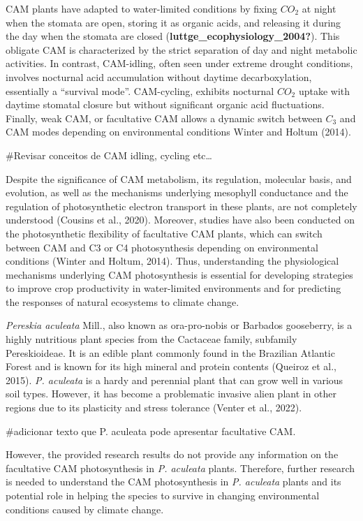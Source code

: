 \documentclass[
  12pt,
  letterpaper,
  DIV=11,
  numbers=noendperiod]{scrartcl}
\begin{document}
CAM plants have adapted to water-limited conditions by fixing \(CO_2\)
at night when the stomata are open, storing it as organic acids, and
releasing it during the day when the stomata are closed
(\textbf{luttge\_ecophysiology\_2004?}). This obligate CAM is
characterized by the strict separation of day and night metabolic
activities. In contrast, CAM-idling, often seen under extreme drought
conditions, involves nocturnal acid accumulation without daytime
decarboxylation, essentially a ``survival mode''. CAM-cycling, exhibits
nocturnal \(CO_2\) uptake with daytime stomatal closure but without
significant organic acid fluctuations. Finally, weak CAM, or facultative
CAM allows a dynamic switch between \(C_3\) and CAM modes depending on
environmental conditions Winter and Holtum (2014).

\#Revisar conceitos de CAM idling, cycling etc\ldots{}

Despite the significance of CAM metabolism, its regulation, molecular
basis, and evolution, as well as the mechanisms underlying mesophyll
conductance and the regulation of photosynthetic electron transport in
these plants, are not completely understood (Cousins et al., 2020).
Moreover, studies have also been conducted on the photosynthetic
flexibility of facultative CAM plants, which can switch between CAM and
C3 or C4 photosynthesis depending on environmental conditions (Winter
and Holtum, 2014). Thus, understanding the physiological mechanisms
underlying CAM photosynthesis is essential for developing strategies to
improve crop productivity in water-limited environments and for
predicting the responses of natural ecosystems to climate change.

\emph{Pereskia aculeata} Mill., also known as ora-pro-nobis or Barbados
gooseberry, is a highly nutritious plant species from the Cactaceae
family, subfamily Pereskioideae. It is an edible plant commonly found in
the Brazilian Atlantic Forest and is known for its high mineral and
protein contents (Queiroz et al., 2015). \emph{P. aculeata} is a hardy
and perennial plant that can grow well in various soil types. However,
it has become a problematic invasive alien plant in other regions due to
its plasticity and stress tolerance (Venter et al., 2022).

\#adicionar texto que P. aculeata pode apresentar facultative CAM.

However, the provided research results do not provide any information on
the facultative CAM photosynthesis in \emph{P. aculeata} plants.
Therefore, further research is needed to understand the CAM
photosynthesis in \emph{P. aculeata} plants and its potential role in
helping the species to survive in changing environmental conditions
caused by climate change.
\end{document}
